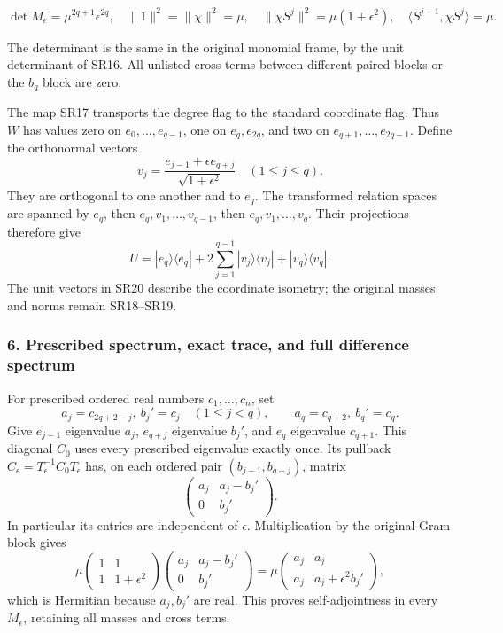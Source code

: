 \[
\det M_\epsilon=\mu^{2q+1}\epsilon^{2q},\quad
\|1\|^2=\|\chi\|^2=\mu,\quad
\|\chi S^j\|^2=\mu(1+\epsilon^2),\quad
\langle S^{j-1},\chi S^j\rangle=\mu.
\tag{SR19}
\]

The determinant is the same in the original monomial frame, by the unit determinant of SR16. All unlisted cross terms between different paired blocks or the \(b_q\) block are zero.

The map SR17 transports the degree flag to the standard coordinate flag. Thus \(W\) has values zero on \(e_0,\ldots,e_{q-1}\), one on \(e_q,e_{2q}\), and two on \(e_{q+1},\ldots,e_{2q-1}\). Define the orthonormal vectors \[
v_j=\frac{e_{j-1}+\epsilon e_{q+j}}{\sqrt{1+\epsilon^2}}
\quad(1\le j\le q).
\tag{SR20}
\] They are orthogonal to one another and to \(e_q\). The transformed relation spaces are spanned by \(e_q\), then \(e_q,v_1,\ldots,v_{q-1}\), then \(e_q,v_1,\ldots,v_q\). Their projections therefore give \[
U=|e_q\rangle\langle e_q|
+2\sum_{j=1}^{q-1}|v_j\rangle\langle v_j|
+|v_q\rangle\langle v_q|.
\tag{SR21}
\] The unit vectors in SR20 describe the coordinate isometry; the original masses and norms remain SR18--SR19.

\subsubsection{6. Prescribed spectrum, exact trace, and full difference spectrum}\label{endpoint-four_window_sharpness_review--prescribed-spectrum-exact-trace-and-full-difference-spectrum}

For prescribed ordered real numbers \(c_1,\ldots,c_n\), set \[
a_j=c_{2q+2-j},\ b_j'=c_j\quad(1\le j<q),\qquad
a_q=c_{q+2},\ b_q'=c_q.
\tag{SR22}
\] Give \(e_{j-1}\) eigenvalue \(a_j\), \(e_{q+j}\) eigenvalue \(b_j'\), and \(e_q\) eigenvalue \(c_{q+1}\). This diagonal \(C_0\) uses every prescribed eigenvalue exactly once. Its pullback \(C_\epsilon=T_\epsilon^{-1}C_0T_\epsilon\) has, on each ordered pair \((b_{j-1},b_{q+j})\), matrix \[
\begin{pmatrix}a_j&a_j-b_j'\\0&b_j'\end{pmatrix}.
\tag{SR23}
\] In particular its entries are independent of \(\epsilon\). Multiplication by the original Gram block gives \[
\mu\begin{pmatrix}1&1\\1&1+\epsilon^2\end{pmatrix}
\begin{pmatrix}a_j&a_j-b_j'\\0&b_j'\end{pmatrix}
=\mu\begin{pmatrix}a_j&a_j\\a_j&a_j+\epsilon^2b_j'\end{pmatrix},
\tag{SR24}
\] which is Hermitian because \(a_j,b_j'\) are real. This proves self-adjointness in every \(M_\epsilon\), retaining all masses and cross terms.

